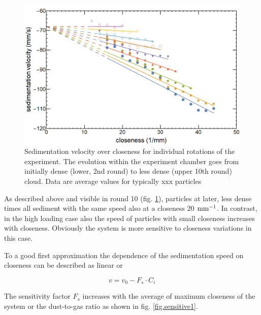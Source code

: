 \begin{figure}[h]
\includegraphics[width=\columnwidth]{vvonc.png}
    \caption{\label{fig.vvonc} Sedimentation velocity over closeness for individual rotations of the experiment. The evolution within the experiment chamber goes from initially dense (lower, 2nd round) to less dense (upper 10th round) cloud. Data are average values for typically xxx particles}
\end{figure}

As described above and visible in round 10 (fig. \ref{fig.vvonc}), particles at later, less dense times all sediment with the same speed also at a closeness 20 $\rm mm^{-1}$.
In contrast, in the high loading case also the speed of particles with small closeness 
increases with closeness. Obviously the system is more sensitive to closeness variations 
in this case. 

To a good first approximation the dependence of the sedimentation speed on closeness can be
described as linear or

\begin{equation}
v = v_0 - F_s \cdot C_i
\end{equation}

The sensitivity factor $F_s$ increases with the average of maximum closeness of the system or the dust-to-gas ratio as shown in fig. \ref{fig.sensitive1}.

